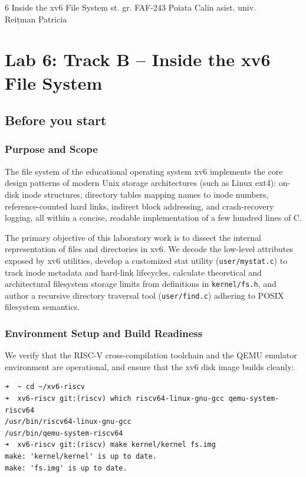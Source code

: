 \documentclass{labreport}
\begin{document}
\labtitle
    {6}
    {Inside the xv6 File System}
    {st. gr. FAF-243}
    {Poiata Calin}
    {asist. univ.\\[0.15cm] Reițman Patricia}

\tableofcontents
\newpage

\section{Lab 6: Track B -- Inside the xv6 File System}

\subsection{Before you start}

\subsubsection*{Purpose and Scope}
The file system of the educational operating system xv6 implements the core design patterns of modern Unix storage architectures (such as Linux ext4): on-disk inode structures, directory tables mapping names to inode numbers, reference-counted hard links, indirect block addressing, and crash-recovery logging, all within a concise, readable implementation of a few hundred lines of C.

The primary objective of this laboratory work is to dissect the internal representation of files and directories in xv6. We decode the low-level attributes exposed by xv6 utilities, develop a customized stat utility (\texttt{user/mystat.c}) to track inode metadata and hard-link lifecycles, calculate theoretical and architectural filesystem storage limits from definitions in \texttt{kernel/fs.h}, and author a recursive directory traversal tool (\texttt{user/find.c}) adhering to POSIX filesystem semantics.

\subsubsection*{Environment Setup and Build Readiness}
We verify that the RISC-V cross-compilation toolchain and the QEMU emulator environment are operational, and ensure that the xv6 disk image builds cleanly:

\begin{lstlisting}[style=bash]
➜  ~ cd ~/xv6-riscv
➜  xv6-riscv git:(riscv) which riscv64-linux-gnu-gcc qemu-system-riscv64
/usr/bin/riscv64-linux-gnu-gcc
/usr/bin/qemu-system-riscv64
➜  xv6-riscv git:(riscv) make kernel/kernel fs.img
make: 'kernel/kernel' is up to date.
make: 'fs.img' is up to date.
\end{lstlisting}
\end{document}
